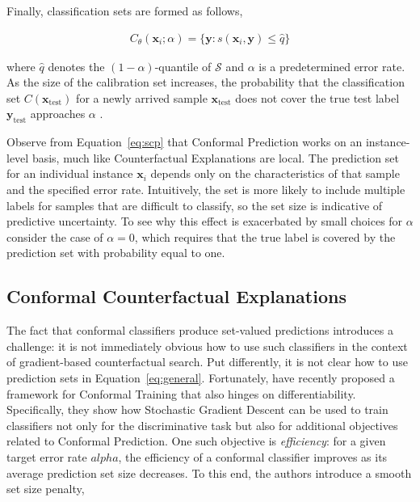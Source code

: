 \documentclass{article}
\begin{document}
Finally, classification sets are formed as follows,

\begin{equation}\label{eq:scp}
  \begin{aligned}
    C_{\theta}(\mathbf{x}_i;\alpha)=\{\mathbf{y}: s(\mathbf{x}_i,\mathbf{y}) \le \hat{q}\}
  \end{aligned}
\end{equation}

where $\hat{q}$ denotes the $(1-\alpha)$-quantile of $\mathcal{S}$ and $\alpha$ is a predetermined error rate. As the size of the calibration set increases, the probability that the classification set $C(\mathbf{x}_{\text{test}})$ for a newly arrived sample $\mathbf{x}_{\text{test}}$ does not cover the true test label $\mathbf{y}_{\text{test}}$ approaches $\alpha$ \citep{angelopoulos2021gentle}. 

Observe from Equation~\ref{eq:scp} that Conformal Prediction works on an instance-level basis, much like Counterfactual Explanations are local. The prediction set for an individual instance $\mathbf{x}_i$ depends only on the characteristics of that sample and the specified error rate. Intuitively, the set is more likely to include multiple labels for samples that are difficult to classify, so the set size is indicative of predictive uncertainty. To see why this effect is exacerbated by small choices for $\alpha$ consider the case of $\alpha=0$, which requires that the true label is covered by the prediction set with probability equal to one.

\subsection{Conformal Counterfactual Explanations}

The fact that conformal classifiers produce set-valued predictions introduces a challenge: it is not immediately obvious how to use such classifiers in the context of gradient-based counterfactual search. Put differently, it is not clear how to use prediction sets in Equation~\ref{eq:general}. Fortunately, \citet{stutz2022learning} have recently proposed a framework for Conformal Training that also hinges on differentiability. Specifically, they show how Stochastic Gradient Descent can be used to train classifiers not only for the discriminative task but also for additional objectives related to Conformal Prediction. One such objective is \textit{efficiency}: for a given target error rate $alpha$, the efficiency of a conformal classifier improves as its average prediction set size decreases. To this end, the authors introduce a smooth set size penalty,
\end{document}
